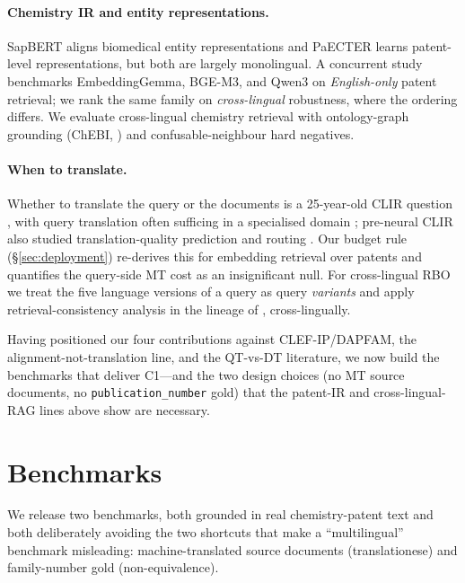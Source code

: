 \documentclass[11pt]{article}
\begin{document}
\paragraph{Chemistry IR and entity representations.}
SapBERT \citep{sapbert2021} aligns biomedical entity representations and PaECTER
\citep{paecter2024} learns patent-level representations, but both are largely
monolingual. A concurrent study \citep{patentembeddings2026} benchmarks
EmbeddingGemma, BGE-M3, and Qwen3 on \emph{English-only} patent retrieval; we
rank the same family on \emph{cross-lingual} robustness, where the ordering
differs. We evaluate cross-lingual chemistry retrieval with ontology-graph
grounding (ChEBI, \citealp{chebi2016}) and confusable-neighbour hard negatives.

\paragraph{When to translate.}
Whether to translate the query or the documents is a 25-year-old CLIR question
\citep{oard1998,salehpecina2020}, with query translation often sufficing in a
specialised domain \citep{salehpecina2020}; pre-neural CLIR also studied
translation-quality prediction and routing \citep{kishida2008}. Our budget rule
(\S\ref{sec:deployment}) re-derives this for embedding retrieval over patents
and quantifies the query-side MT cost as an insignificant null. For
cross-lingual RBO we treat the five language versions of a query as query
\emph{variants} and apply retrieval-consistency analysis in the lineage of
\citet{bailey2017consistency}, cross-lingually.

Having positioned our four contributions against CLEF-IP/DAPFAM, the
alignment-not-translation line, and the QT-vs-DT literature, we now build the
benchmarks that deliver C1---and the two design choices (no MT source
documents, no \texttt{publication\_number} gold) that the patent-IR and
cross-lingual-RAG lines above show are necessary.

\section{Benchmarks}
\label{sec:benchmarks}

We release two benchmarks, both grounded in real chemistry-patent text and both
deliberately avoiding the two shortcuts that make a ``multilingual'' benchmark
misleading: machine-translated source documents (translationese) and
family-number gold (non-equivalence).
\end{document}
